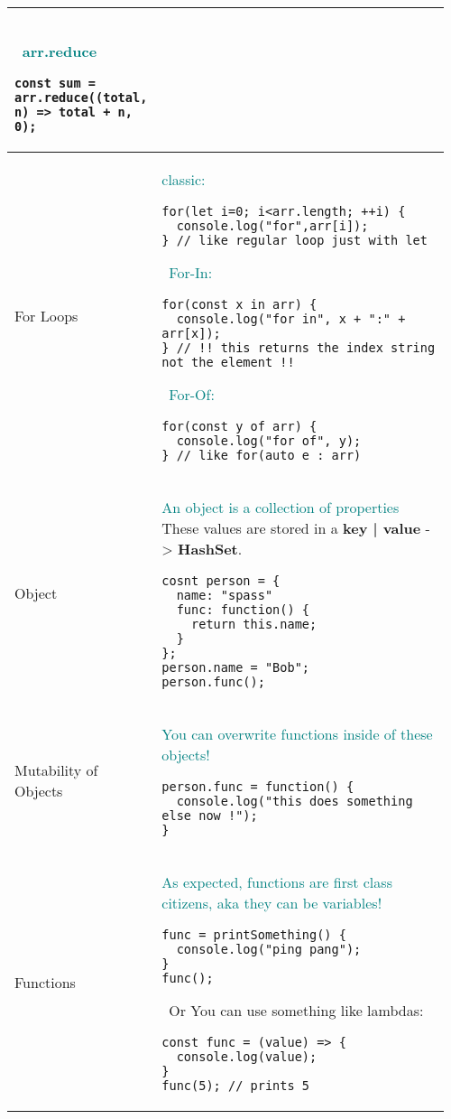 \documentclass[main.tex,fontsize=8pt,paper=a4,paper=portrait,DIV=calc,]{scrartcl}
\begin{document}
\begin{table}[ht!]
\begin{tabular}{|m{0.2\linewidth}|m{0.755\linewidth}|}
\begin{lstlisting}
\end{lstlisting}
\, \newline
\textcolor{teal}{arr.reduce}\newline
\begin{lstlisting}
const sum = arr.reduce((total, n) => total + n, 0);
\end{lstlisting}
\\
\hline
For Loops & 
\textcolor{teal}{classic:}\newline
\begin{lstlisting}
for(let i=0; i<arr.length; ++i) {
  console.log("for",arr[i]);
} // like regular loop just with let
\end{lstlisting}
\, \newline
\textcolor{teal}{For-In:}\newline
\begin{lstlisting}
for(const x in arr) {
  console.log("for in", x + ":" + arr[x]);
} // !! this returns the index string not the element !!
\end{lstlisting}
\, \newline
\textcolor{teal}{For-Of:}\newline
\begin{lstlisting}
for(const y of arr) {
  console.log("for of", y);
} // like for(auto e : arr)
\end{lstlisting}
\\
\hline
Object & 
\textcolor{teal}{An object is a collection of properties}\newline
These values are stored in a \textbf{key | value} -> \textbf{HashSet}.\newline
\begin{lstlisting}
cosnt person = {
  name: "spass"
  func: function() {
    return this.name;
  }
};
person.name = "Bob";
person.func();
\end{lstlisting}\\
\hline
Mutability of Objects & 
\textcolor{teal}{You can overwrite functions inside of these objects!}\newline
\begin{lstlisting}
person.func = function() {
  console.log("this does something else now !");
}
\end{lstlisting}\\
\hline
Functions &
\textcolor{teal}{As expected, functions are first class citizens, aka they can be variables!}\newline
\begin{lstlisting}
func = printSomething() {
  console.log("ping pang");
}
func();
\end{lstlisting}
\, \newline
Or You can use something like lambdas:\newline
\begin{lstlisting}
const func = (value) => {
  console.log(value);
}
func(5); // prints 5
\end{lstlisting}\\
\hline
\end{tabular}
\end{table}
\end{document}
